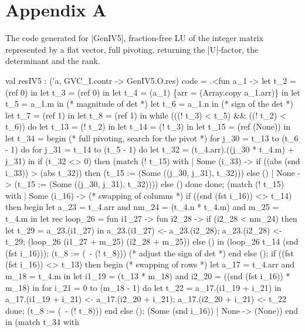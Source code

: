 \documentclass[draft]{elsart}
\begin{document}
\section{Appendix A}
The code generated for |GenIV5|, fraction-free LU of the integer matrix
represented by a flat vector, full pivoting, returning the |U|-factor,
the determinant and the rank.
\begin{code2}
val resIV5 : ('a, GVC_I.contr -> GenIV5.O.res) code =
  .<fun a_1 ->
   let t_2 = (ref 0) in
   let t_3 = (ref 0) in
   let t_4 = (a_1) \{arr = (Array.copy a_1.arr)\} in
   let t_5 = a_1.m in  (* magnitude of det *)
   let t_6 = a_1.n in  (* sign of the det *)
   let t_7 = (ref 1) in
   let t_8 = (ref 1) in
   while (((! t_3) < t_5) && ((! t_2) < t_6)) do
    let t_13 = (! t_2) in
    let t_14 = (! t_3) in
    let t_15 = (ref (None)) in
    let t_34 =
     begin (* full pivoting, search for the pivot *)
      for j_30 = t_13 to (t_6 - 1) do
       for j_31 = t_14 to (t_5 - 1) do
        let t_32 = (t_4.arr).((j_30 * t_4.m) + j_31) in
        if (t_32 <> 0) then
         (match (! t_15) with
          | Some (i_33) ->
             if ((abs (snd i_33)) > (abs t_32)) then
              (t_15 := (Some ((j_30, j_31), t_32)))
             else ()
          | None -> (t_15 := (Some ((j_30, j_31), t_32))))
        else ()
       done
      done;
      (match (! t_15) with
       | Some (i_16) -> (* swapping of columns *)
          if ((snd (fst i_16)) <> t_14) then begin
           let a_23 = t_4.arr
           and nm_24 = (t_4.n * t_4.m)
           and m_25 = t_4.m in
           let rec loop_26 =
            fun i1_27 ->
             fun i2_28 ->
              if (i2_28 < nm_24) then
               let t_29 = a_23.(i1_27) in
               a_23.(i1_27) <- a_23.(i2_28);
               a_23.(i2_28) <- t_29;
               (loop_26 (i1_27 + m_25) (i2_28 + m_25))
              else () in
           (loop_26 t_14 (snd (fst i_16)));
           (t_8 := (~- (! t_8))) (* adjust the sign of det *)
          end else ();
          if ((fst (fst i_16)) <> t_13) then begin (* swapping of rows *)
           let a_17 = t_4.arr
           and m_18 = t_4.m in
           let i1_19 = (t_13 * m_18)
           and i2_20 = ((snd (fst i_16)) * m_18) in
           for i_21 = 0 to (m_18 - 1) do
            let t_22 = a_17.(i1_19 + i_21) in
            a_17.(i1_19 + i_21) <- a_17.(i2_20 + i_21);
            a_17.(i2_20 + i_21) <- t_22
           done;
           (t_8 := (~- (! t_8)))
          end else ();
          (Some (snd i_16))
       | None -> (None))
     end in
    (match t_34 with

\end{code2}
\end{document}
